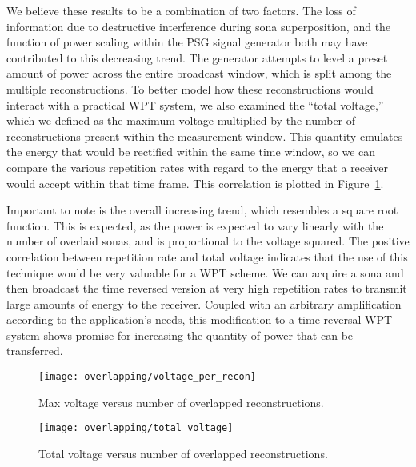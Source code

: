 We believe these results to be a combination of two factors. The loss of information due to destructive interference during sona superposition, and the function of power scaling within the PSG signal generator both may have contributed to this decreasing trend. The generator attempts to level a preset amount of power across the entire broadcast window, which is split among the multiple reconstructions.
To better model how these reconstructions would interact with a practical WPT system, we also examined the ``total \ptp voltage,'' which we defined as the maximum \ptp voltage multiplied by the number of reconstructions present within the measurement window. This quantity emulates the energy that would be rectified within the same time window, so we can compare the various repetition rates with regard to the energy that a receiver would accept within that time frame. This correlation is plotted in Figure~\ref{fig:overlapping-total-voltage}.

Important to note is the overall increasing trend, which resembles a square root function. This is expected, as the power is expected to vary linearly with the number of overlaid sonas, and is proportional to the \ptp voltage squared. The positive correlation between repetition rate and total voltage indicates that the use of this technique would be very valuable for a WPT scheme. We can acquire a sona and then broadcast the time reversed version at very high repetition rates to transmit large amounts of energy to the receiver. Coupled with an arbitrary amplification according to the application's needs, this modification to a time reversal WPT system shows promise for increasing the quantity of power that can be transferred.

\begin{figure}
\centering
\texttt{[image: overlapping/voltage\_per\_recon]}
\caption[Max \ptp voltage from overlapped reconstructions]{Max \ptp voltage versus number of overlapped reconstructions.}
\label{fig:overlapping-vpp}

\vspace*{\floatsep}%

\texttt{[image: overlapping/total\_voltage]}
\caption[Total \ptp voltage from overlapped reconstructions]{Total \ptp voltage versus number of overlapped reconstructions.}
\label{fig:overlapping-total-voltage}
\end{figure}

